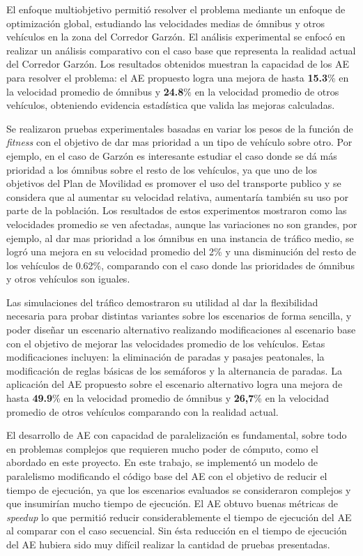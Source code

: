 El enfoque multiobjetivo permitió resolver el problema mediante un enfoque de optimización global, estudiando las velocidades medias de ómnibus y otros vehículos en la zona del Corredor Garzón. El análisis experimental se enfocó en realizar un análisis comparativo con el caso base que representa la realidad actual del Corredor Garzón. Los resultados obtenidos muestran la capacidad de los AE para resolver el problema: el AE propuesto logra una mejora de hasta \textbf{15.3}\% en la velocidad promedio de ómnibus y \textbf{24.8}\% en la velocidad promedio de otros vehículos, obteniendo evidencia estadística que valida las mejoras calculadas.

Se realizaron pruebas experimentales basadas en variar los pesos de la función de \emph{fitness} con el objetivo de dar mas prioridad a un tipo de vehículo sobre otro. Por ejemplo, en el caso de Garzón es interesante estudiar el caso donde se dá más prioridad a los ómnibus sobre el resto de los vehículos, ya que uno de los objetivos del Plan de Movilidad es promover el uso del transporte publico y se considera que al aumentar su velocidad relativa, aumentaría también su uso por parte de la población. Los resultados de estos experimentos mostraron como las velocidades promedio se ven afectadas, aunque las variaciones no son grandes, por ejemplo, al dar mas prioridad a los ómnibus en una instancia de tráfico medio, se logró una mejora en su velocidad promedio del 2\% y una disminución del resto de los vehículos de 0.62\%, comparando con el caso donde las prioridades de ómnibus y otros vehículos son iguales.

Las simulaciones del tráfico demostraron su utilidad al dar la flexibilidad necesaria para probar distintas variantes sobre los escenarios de forma sencilla, y poder diseñar un escenario alternativo realizando modificaciones al escenario base con el objetivo de mejorar las velocidades promedio de los vehículos. Estas modificaciones incluyen: la eliminación de paradas y pasajes peatonales, la modificación de reglas básicas de los semáforos y la alternancia de paradas. La aplicación del AE propuesto sobre el escenario alternativo logra una mejora de hasta \textbf{49.9}\% en la velocidad promedio de ómnibus y \textbf{26,7}\% en la velocidad promedio de otros vehículos comparando con la realidad actual.

El desarrollo de AE con capacidad de paralelización es fundamental, sobre todo en problemas complejos que requieren mucho poder de cómputo, como el abordado en este proyecto. En este trabajo, se implementó un modelo de paralelismo modificando el código base del AE con el objetivo de reducir el tiempo de ejecución, ya que los escenarios evaluados se consideraron complejos y que insumirían mucho tiempo de ejecución. El AE obtuvo buenas métricas de \emph{speedup} lo que permitió reducir considerablemente el tiempo de ejecución del AE al comparar con el caso secuencial. Sin ésta reducción en el tiempo de ejecución del AE hubiera sido muy difícil realizar la cantidad de pruebas presentadas.

